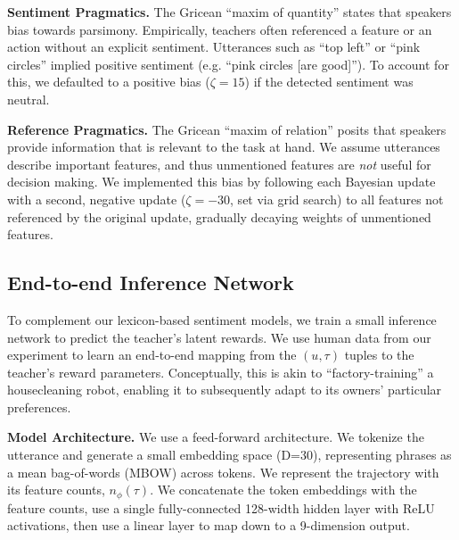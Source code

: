 \documentclass[letterpaper]{article} %
\begin{document}
\textbf{Sentiment Pragmatics.} The Gricean ``maxim of quantity'' states that speakers bias towards parsimony. Empirically, teachers often referenced a feature or an action without an explicit sentiment. Utterances such as ``top left'' or ``pink circles'' implied positive sentiment (e.g. ``pink circles [are good]''). To account for this, we defaulted to a positive bias ($\zeta = 15$) if the detected sentiment was neutral.

\textbf{Reference Pragmatics.} The Gricean ``maxim of relation'' posits that speakers provide information that is relevant to the task at hand. We assume utterances describe important features, and thus unmentioned features are \textit{not} useful for decision making. We implemented this bias by following each Bayesian update with a second, negative update ($\zeta = -30$, set via grid search) to all features not referenced by the original update, gradually decaying weights of unmentioned features.

\subsection{End-to-end Inference Network}
\label{learned_model_desc}
To complement our lexicon-based sentiment models, we train a small inference network to predict the teacher's latent rewards. We use human data from our experiment to learn an end-to-end mapping from the $(u, \tau)$ tuples to the teacher's reward parameters. Conceptually, this is akin to ``factory-training'' a housecleaning robot, enabling it to subsequently adapt to its owners' particular preferences.

\textbf{Model Architecture.} We use a feed-forward architecture. We tokenize the utterance and generate a small embedding space (D=30), representing phrases as a mean bag-of-words (MBOW) across tokens. We represent the trajectory with its feature counts, $n_\phi(\tau)$. We concatenate the token embeddings with the feature counts, use a single fully-connected 128-width hidden layer with ReLU activations, then use a linear layer to map down to a 9-dimension output.
\end{document}
